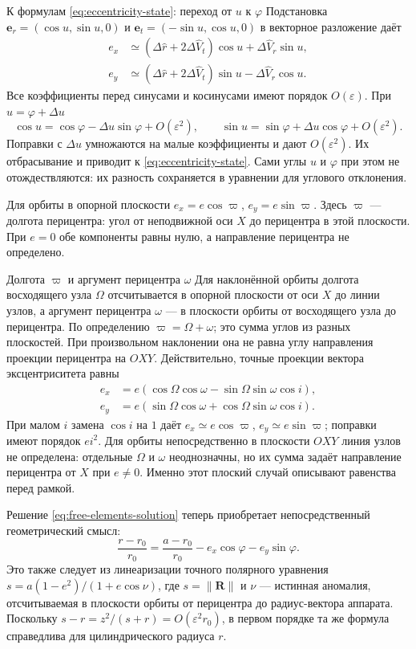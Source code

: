 \documentclass[a4paper,11pt]{article}
\numberwithin{equation}{section}
\theoremstyle{remark}
\begin{document}
\begin{explanation}{К формулам \eqref{eq:eccentricity-state}: переход от $u$ к $\varphi$}
Подстановка $\boldsymbol e_r=(\cos u,\sin u,0)$ и
$\boldsymbol e_t=(-\sin u,\cos u,0)$ в векторное разложение даёт
\[
\begin{aligned}
e_x&\simeq(\Delta\widehat r+2\Delta\widehat V_t)\cos u
                   +\Delta\widehat V_r\sin u,\\
e_y&\simeq(\Delta\widehat r+2\Delta\widehat V_t)\sin u
                   -\Delta\widehat V_r\cos u.
\end{aligned}
\]
Все коэффициенты перед синусами и косинусами имеют порядок
$O(\varepsilon)$. При $u=\varphi+\Delta u$
\[
\cos u=\cos\varphi-\Delta u\sin\varphi+O(\varepsilon^2),\qquad
\sin u=\sin\varphi+\Delta u\cos\varphi+O(\varepsilon^2).
\]
Поправки с $\Delta u$ умножаются на малые коэффициенты и дают
$O(\varepsilon^2)$. Их отбрасывание и приводит к
\eqref{eq:eccentricity-state}. Сами углы $u$ и $\varphi$ при этом
не отождествляются: их разность сохраняется в уравнении для углового отклонения.
\end{explanation}

Для орбиты в опорной плоскости
$e_x=e\cos\varpi$, $e_y=e\sin\varpi$.
Здесь $\varpi$ --- долгота перицентра: угол от неподвижной оси $X$
до перицентра в этой плоскости. При $e=0$ обе компоненты равны нулю,
а направление перицентра не определено.
\begin{explanation}{Долгота $\varpi$ и аргумент перицентра $\omega$}
Для наклонённой орбиты долгота восходящего узла $\Omega$
отсчитывается в опорной плоскости от оси $X$ до линии узлов,
а аргумент перицентра $\omega$ --- в плоскости орбиты от
восходящего узла до перицентра. По определению $\varpi=\Omega+\omega$;
это сумма углов из разных плоскостей. При произвольном наклонении
она не равна углу направления проекции перицентра на $OXY$.
Действительно, точные проекции вектора эксцентриситета равны
\[
\begin{aligned}
e_x&=e(\cos\Omega\cos\omega-\sin\Omega\sin\omega\cos i),\\
e_y&=e(\sin\Omega\cos\omega+\cos\Omega\sin\omega\cos i).
\end{aligned}
\]
При малом $i$ замена $\cos i$ на $1$ даёт
$e_x\simeq e\cos\varpi$, $e_y\simeq e\sin\varpi$;
поправки имеют порядок $ei^2$.
Для орбиты непосредственно в плоскости $OXY$ линия узлов
не определена: отдельные $\Omega$ и $\omega$ неоднозначны,
но их сумма задаёт направление перицентра от $X$ при $e\ne0$.
Именно этот плоский случай описывают равенства перед рамкой.
\end{explanation}
Решение \eqref{eq:free-elements-solution} теперь приобретает
непосредственный геометрический смысл:
\[
 \frac{{r-r_0}}{{r_0}}
 =\frac{{a-r_0}}{{r_0}}-e_x\cos\varphi-e_y\sin\varphi.
\]
Это также следует из линеаризации точного полярного уравнения
$s=a(1-e^2)/(1+e\cos\nu)$, где $s=\lVert\boldsymbol R\rVert$
и $\nu$ --- истинная аномалия, отсчитываемая в плоскости орбиты
от перицентра до радиус-вектора аппарата. Поскольку
$s-r=z^2/(s+r)=O(\varepsilon^2r_0)$, в первом порядке та же
формула справедлива для цилиндрического радиуса $r$.
\end{document}

